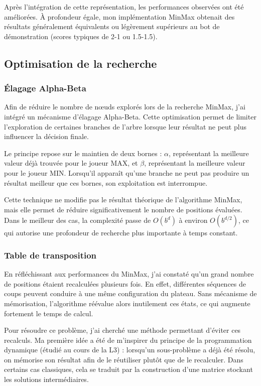 \documentclass[11pt,a4paper]{article}
\begin{document}
Après l'intégration de cette représentation, les performances observées ont été améliorées. À profondeur égale, mon implémentation
MinMax obtenait des résultats généralement équivalents ou légèrement supérieurs au bot de démonstration (scores typiques 
de 2-1 ou 1.5-1.5).

\subsection{Optimisation de la recherche}

\subsubsection{Élagage Alpha-Beta}

Afin de réduire le nombre de nœuds explorés lors de la recherche MinMax, j'ai intégré un mécanisme d'élagage Alpha-Beta. Cette
optimisation permet de limiter l'exploration de certaines branches de l'arbre lorsque leur résultat ne peut plus influencer la
décision finale.

Le principe repose sur le maintien de deux bornes : $\alpha$, représentant la meilleure valeur déjà trouvée pour le joueur
MAX, et $\beta$, représentant la meilleure valeur pour le joueur MIN. Lorsqu'il apparaît qu'une branche ne peut pas produire
un résultat meilleur que ces bornes, son exploitation est interrompue.

Cette technique ne modifie pas le résultat théorique de l'algorithme MinMax, mais elle permet de réduire significativement le
nombre de positions évaluées. Dans le meilleur des cas, la complexité passe de $O(b^d)$ à environ $O(b^{d/2})$, ce qui autorise
une profondeur de recherche plus importante à temps constant.

\subsubsection{Table de transposition}

En réfléchissant aux performances du MinMax, j'ai constaté qu'un grand nombre de positions étaient recalculées plusieurs fois.
En effet, différentes séquences de coups peuvent conduire à une même configuration du plateau. Sans mécanisme de mémorisation,
l'algorithme réévalue alors inutilement ces états, ce qui augmente fortement le temps de calcul.

Pour résoudre ce problème, j'ai cherché une méthode permettant d'éviter ces recalculs. Ma première idée a été de m'inspirer du
principe de la programmation dynamique (étudié au cours de la L3) : lorsqu'un sous-problème a déjà été résolu, on mémorise son
résultat afin de le réutiliser plutôt que de le recalculer. Dans certains cas classiques, cela se traduit par la construction
d'une matrice stockant les solutions intermédiaires.
\end{document}
